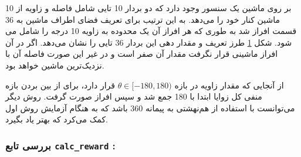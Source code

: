 بر روی ماشین یک سنسور وجود دارد که دو بردار 10 تایی شامل فاصله و زاویه از 10 ماشین کنار خود را می‌دهد. به این ترتیب برای تعریف  فضای اطراف ماشین به 36 قسمت افراز شد به طوری که هر افراز آن یک محدوده به زاویه 10 درجه را شامل می شود. 
شکل \ref{fig:agent-degree-total} طرز تعریف و مقدار دهی این بردار 36 تایی را نشان می‌دهد.
اگر در آن افراز ماشینی قرار نگرفت مقدار آن صفر است و در غیر این صورت فاصله آن با نزدیک‌ترین ماشین خواهد بود.

\begin{figure}
	\centering
	\hspace*{0.05\linewidth}
	\caption{}
	\label{fig:agent-degree-total}
\end{figure}

\begin{note}
	از آنجایی که مقدار زاویه در بازه $\theta \in [-180,180)$ قرار دارد، برای از بین بردن بازه منفی کل زوایا ابتدا با 180 جمع شد و سپس افراز صورت گرفت. روش دیگر می‌توانست با استفاده از هم‌نهشتی به پیمانه 360 باشد که به هنگام آزمایش روش اول کمک می‌کرد که بهتر یاد بگیرد.
\end{note}


\subsubsection{بررسی تابع \textbf{\texttt{calc\_reward} :}}

